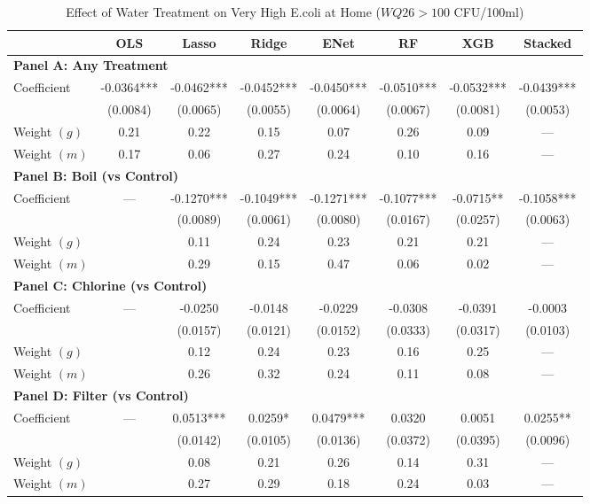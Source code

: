\begin{table}[htbp]
\centering
\caption{Effect of Water Treatment on Very High E.coli at Home ($WQ26>100$ CFU/100ml)}
\label{tab:very_high_risk_home_full}
\begin{tabular}{lccccccc}
\toprule
 & OLS & Lasso & Ridge & ENet & RF & XGB & Stacked \\
\midrule
\multicolumn{8}{l}{\textbf{Panel A: Any Treatment}} \\
\midrule
Coefficient & -0.0364*** & -0.0462*** & -0.0452*** & -0.0450*** & -0.0510*** & -0.0532*** & -0.0439*** \\
 & (0.0084) & (0.0065) & (0.0055) & (0.0064) & (0.0067) & (0.0081) & (0.0053) \\
Weight $(g)$ & 0.21 & 0.22 & 0.15 & 0.07 & 0.26 & 0.09 & — \\
Weight $(m)$ & 0.17 & 0.06 & 0.27 & 0.24 & 0.10 & 0.16 & — \\

\multicolumn{8}{l}{\textbf{Panel B: Boil (vs Control)}} \\
\midrule
Coefficient & --- & -0.1270*** & -0.1049*** & -0.1271*** & -0.1077*** & -0.0715** & -0.1058*** \\
 &  & (0.0089) & (0.0061) & (0.0080) & (0.0167) & (0.0257) & (0.0063) \\
Weight $(g)$ &  & 0.11 & 0.24 & 0.23 & 0.21 & 0.21 & — \\
Weight $(m)$ &  & 0.29 & 0.15 & 0.47 & 0.06 & 0.02 & — \\

\multicolumn{8}{l}{\textbf{Panel C: Chlorine (vs Control)}} \\
\midrule
Coefficient & --- & -0.0250 & -0.0148 & -0.0229 & -0.0308 & -0.0391 & -0.0003 \\
 &  & (0.0157) & (0.0121) & (0.0152) & (0.0333) & (0.0317) & (0.0103) \\
Weight $(g)$ &  & 0.12 & 0.24 & 0.23 & 0.16 & 0.25 & — \\
Weight $(m)$ &  & 0.26 & 0.32 & 0.24 & 0.11 & 0.08 & — \\

\multicolumn{8}{l}{\textbf{Panel D: Filter (vs Control)}} \\
\midrule
Coefficient & --- & 0.0513*** & 0.0259* & 0.0479*** & 0.0320 & 0.0051 & 0.0255** \\
 &  & (0.0142) & (0.0105) & (0.0136) & (0.0372) & (0.0395) & (0.0096) \\
Weight $(g)$ &  & 0.08 & 0.21 & 0.26 & 0.14 & 0.31 & — \\
Weight $(m)$ &  & 0.27 & 0.29 & 0.18 & 0.24 & 0.03 & — \\


\end{tabular}
\end{table}
